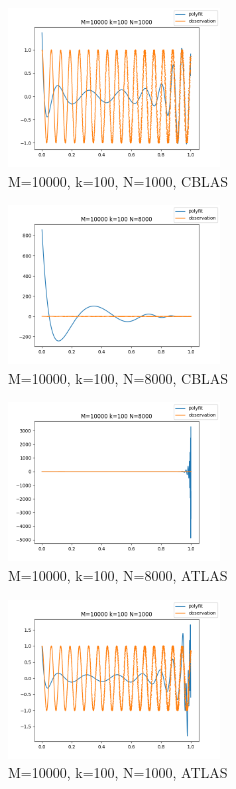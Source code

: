 \documentclass[a4paper]{article}
\begin{document}
\begin{figure}[tbp]
  \centering
  \includegraphics[width=0.5\textwidth]{figures/lapack/figure5_M_10000_k_100_N_1000.png}
  \caption{M=10000, k=100, N=1000, CBLAS}
  \label{fig:exp3}
\end{figure}

\begin{figure}[tbp]
  \centering
  \includegraphics[width=0.5\textwidth]{figures/lapack/figure8_M_10000_k_100_N_8000.png}
  \caption{M=10000, k=100, N=8000, CBLAS}
  \label{fig:exp4}
\end{figure}

\begin{figure}[tbp]
  \centering
  \includegraphics[width=0.5\textwidth]{figures/atlas/figure7_M_10000_k_100_N_8000.png}
  \caption{M=10000, k=100, N=8000, ATLAS}
  \label{fig:exp5}
\end{figure}

\begin{figure}[tbp]
  \centering
  \includegraphics[width=0.5\textwidth]{figures/atlas/figure4_M_10000_k_100_N_1000.png}
  \caption{M=10000, k=100, N=1000, ATLAS}
  \label{fig:atlas}
\end{figure}
\end{document}
